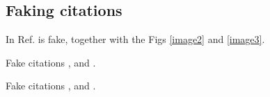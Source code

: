 \documentclass[%
 reprint,
 amsmath,
 amssymb,
 aps,
]{revtex4-2}
\begin{document}
\lipsum[1-2]


\lipsum[1-2]


\subsection{Faking citations}

In Ref. \cite{guo2020risk} is fake, together with the Figs \ref{image2} and \ref{image3}.

Fake citations \cite{guo2020risk}, and \cite{chen2020interpretation}.

Fake citations \cite{chakraborty2020multiphonon}, and \cite{chen2020interpretation}.

\end{document}
